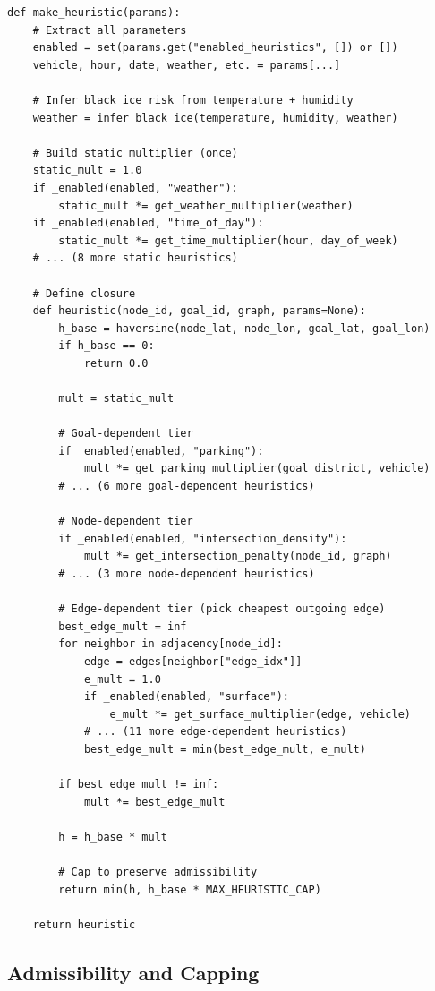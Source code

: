 \documentclass[12pt,a4paper]{article}
\begin{document}
\begin{lstlisting}
def make_heuristic(params):
    # Extract all parameters
    enabled = set(params.get("enabled_heuristics", []) or [])
    vehicle, hour, date, weather, etc. = params[...]

    # Infer black ice risk from temperature + humidity
    weather = infer_black_ice(temperature, humidity, weather)

    # Build static multiplier (once)
    static_mult = 1.0
    if _enabled(enabled, "weather"):
        static_mult *= get_weather_multiplier(weather)
    if _enabled(enabled, "time_of_day"):
        static_mult *= get_time_multiplier(hour, day_of_week)
    # ... (8 more static heuristics)

    # Define closure
    def heuristic(node_id, goal_id, graph, params=None):
        h_base = haversine(node_lat, node_lon, goal_lat, goal_lon)
        if h_base == 0:
            return 0.0

        mult = static_mult

        # Goal-dependent tier
        if _enabled(enabled, "parking"):
            mult *= get_parking_multiplier(goal_district, vehicle)
        # ... (6 more goal-dependent heuristics)

        # Node-dependent tier
        if _enabled(enabled, "intersection_density"):
            mult *= get_intersection_penalty(node_id, graph)
        # ... (3 more node-dependent heuristics)

        # Edge-dependent tier (pick cheapest outgoing edge)
        best_edge_mult = inf
        for neighbor in adjacency[node_id]:
            edge = edges[neighbor["edge_idx"]]
            e_mult = 1.0
            if _enabled(enabled, "surface"):
                e_mult *= get_surface_multiplier(edge, vehicle)
            # ... (11 more edge-dependent heuristics)
            best_edge_mult = min(best_edge_mult, e_mult)

        if best_edge_mult != inf:
            mult *= best_edge_mult

        h = h_base * mult

        # Cap to preserve admissibility
        return min(h, h_base * MAX_HEURISTIC_CAP)

    return heuristic
\end{lstlisting}

\subsection{Admissibility and Capping}
\end{document}
